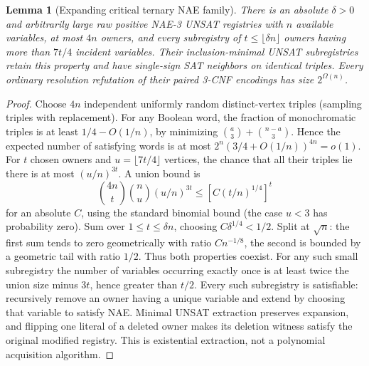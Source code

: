 \documentclass[11pt]{article}
\newtheorem{lemma}[theorem]{Lemma}
\begin{document}
\begin{lemma}[Expanding critical ternary NAE family]\label{lem:da20-exp}
There is an absolute $\delta>0$ and arbitrarily large raw positive NAE-3 UNSAT registries with $n$ available variables, at most $4n$ owners, and every subregistry of $t\le \lfloor\delta n\rfloor$ owners having more than $7t/4$ incident variables. Their inclusion-minimal UNSAT subregistries retain this property and have single-sign SAT neighbors on identical triples. Every ordinary resolution refutation of their paired 3-CNF encodings has size $2^{\Omega(n)}$.
\end{lemma}
\begin{proof}
Choose $4n$ independent uniformly random distinct-vertex triples (sampling triples with replacement). For any Boolean word, the fraction of monochromatic triples is at least $1/4-O(1/n)$, by minimizing $\binom a3+\binom{n-a}3$. Hence the expected number of satisfying words is at most $2^n(3/4+O(1/n))^{4n}=o(1)$. For $t$ chosen owners and $u=\lfloor7t/4\rfloor$ vertices, the chance that all their triples lie there is at most $(u/n)^{3t}$. A union bound is
\[
\binom{4n}{t}\binom{n}{u}(u/n)^{3t}
\le [C(t/n)^{1/4}]^t
\]
for an absolute $C$, using the standard binomial bound (the case $u<3$ has probability zero). Sum over $1\le t\le\delta n$, choosing $C\delta^{1/4}<1/2$. Split at $\sqrt n$: the first sum tends to zero geometrically with ratio $Cn^{-1/8}$, the second is bounded by a geometric tail with ratio $1/2$. Thus both properties coexist. For any such small subregistry the number of variables occurring exactly once is at least twice the union size minus $3t$, hence greater than $t/2$. Every such subregistry is satisfiable: recursively remove an owner having a unique variable and extend by choosing that variable to satisfy NAE. Minimal UNSAT extraction preserves expansion, and flipping one literal of a deleted owner makes its deletion witness satisfy the original modified registry. This is existential extraction, not a polynomial acquisition algorithm.


\end{proof}
\end{document}
